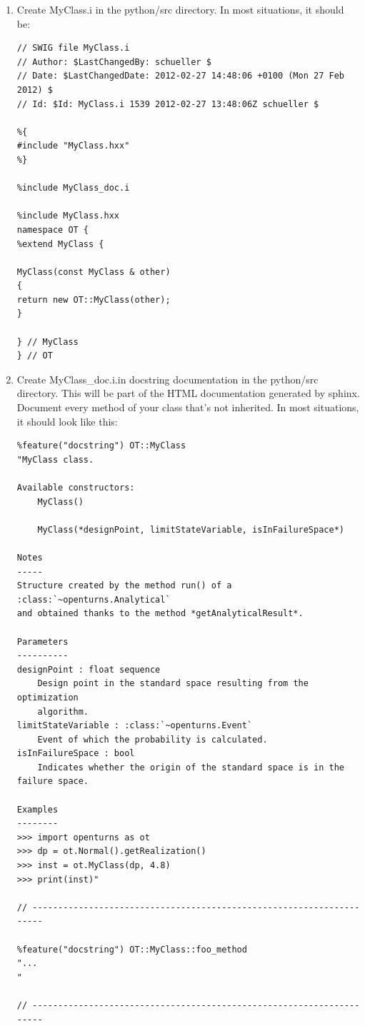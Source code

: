 \begin{enumerate}
\setcounter{enumi}{\value{oldenumi}}
\item Create MyClass.i in the python/src directory. In most situations, it should be:
\begin{lstlisting}
// SWIG file MyClass.i
// Author: $LastChangedBy: schueller $
// Date: $LastChangedDate: 2012-02-27 14:48:06 +0100 (Mon 27 Feb 2012) $
// Id: $Id: MyClass.i 1539 2012-02-27 13:48:06Z schueller $

%{
#include "MyClass.hxx"
%}

%include MyClass_doc.i

%include MyClass.hxx
namespace OT {
%extend MyClass {

MyClass(const MyClass & other)
{
return new OT::MyClass(other);
}

} // MyClass
} // OT
\end{lstlisting}

\item Create MyClass\_doc.i.in docstring documentation in the python/src directory. This will be part of the HTML documentation generated by sphinx.
Document every method of your class that's not inherited. In most situations, it should look like this:

\begin{lstlisting}
%feature("docstring") OT::MyClass
"MyClass class.

Available constructors:
    MyClass()

    MyClass(*designPoint, limitStateVariable, isInFailureSpace*)

Notes
-----
Structure created by the method run() of a :class:`~openturns.Analytical`
and obtained thanks to the method *getAnalyticalResult*.

Parameters
----------
designPoint : float sequence
    Design point in the standard space resulting from the optimization
    algorithm.
limitStateVariable : :class:`~openturns.Event`
    Event of which the probability is calculated.
isInFailureSpace : bool
    Indicates whether the origin of the standard space is in the failure space.

Examples
--------
>>> import openturns as ot
>>> dp = ot.Normal().getRealization()
>>> inst = ot.MyClass(dp, 4.8)
>>> print(inst)"

// ---------------------------------------------------------------------

%feature("docstring") OT::MyClass::foo_method
"...
"

// ---------------------------------------------------------------------


\end{lstlisting}
\end{enumerate}
